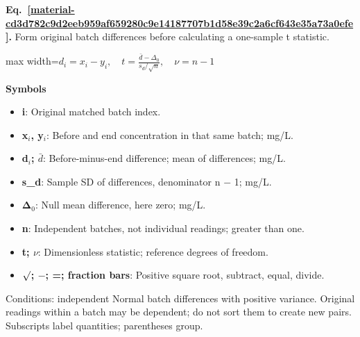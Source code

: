 \documentclass[11pt,a4paper]{article}
\begin{document}
\par\medskip
\noindent\begin{minipage}{\linewidth}
\label{material-cd3d782c9d2eeb959af659280c9e14187707b1d58e39c2a6cf643e35a73a0efe}
\noindent\textbf{Eq.~\ref*{material-cd3d782c9d2eeb959af659280c9e14187707b1d58e39c2a6cf643e35a73a0efe}.} Form original batch differences before calculating a one-sample t statistic.\par\nopagebreak
\begin{center}\begin{adjustbox}{max width=\linewidth}$\displaystyle d_i=x_i-y_i,\quad t=\frac{\bar d-\Delta_0}{s_d/\sqrt n},\quad \nu=n-1$\end{adjustbox}\end{center}

\par\noindent\textbf{Symbols}

\begin{itemize}\setlength{\itemsep}{1pt}\setlength{\parsep}{0pt}
\item \textbf{i}: Original matched batch index.
\item \textbf{x\ensuremath{{}_i}, y\ensuremath{{}_i}}: Before and end concentration in that same batch; mg/L.
\item \textbf{d\ensuremath{{}_i}; \ensuremath{\bar{d}}}: Before-minus-end difference; mean of differences; mg/L.
\item \textbf{s\_d}: Sample SD of differences, denominator n \ensuremath{-} 1; mg/L.
\item \textbf{Δ\ensuremath{{}_0}}: Null mean difference, here zero; mg/L.
\item \textbf{n}: Independent batches, not individual readings; greater than one.
\item \textbf{t; \ensuremath{\nu}}: Dimensionless statistic; reference degrees of freedom.
\item \textbf{\ensuremath{\sqrt{\vphantom{x}}}; \ensuremath{-}; =; fraction bars}: Positive square root, subtract, equal, divide.
\end{itemize}

Conditions: independent Normal batch differences with positive variance. Original readings within a batch may be dependent; do not sort them to create new pairs. Subscripts label quantities; parentheses group.

\end{minipage}\par
\medskip
\end{document}
